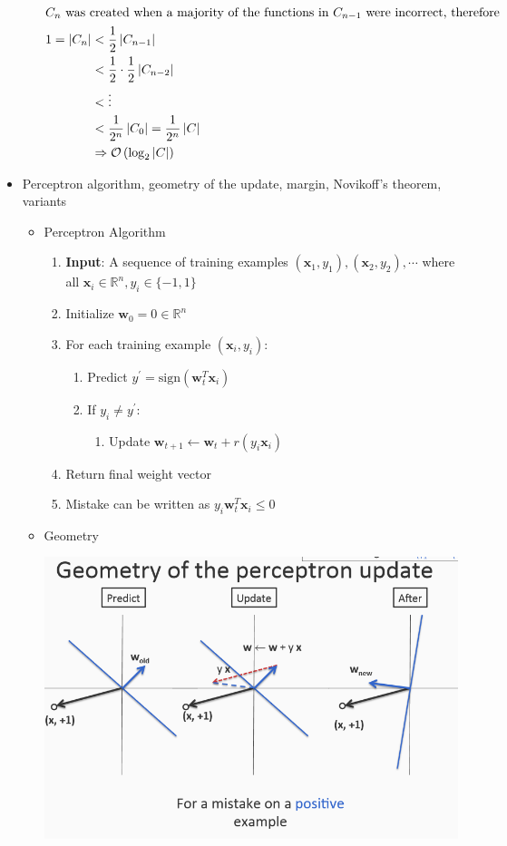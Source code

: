 \documentclass{article}
\begin{document}
\begin{itemize}
\begin{itemize}
\begin{align*}
		\intertext{$C_{n}$ was created when a majority of the functions in $C_{n-1}$ were incorrect, therefore}
		1 = \left| C_{n}\right| &< \frac{1}{2}\left| C_{n-1}\right|\\
					&< \frac{1}{2}\cdot \frac{1}{2}\left| C_{n-2}\right|\\
					&< \vdots\\
					&< \frac{1}{2^{n}}\left| C_{0}\right| = \frac{1}{2^{n}}\left| C\right|\\
					&\Rightarrow \mathcal{O}\left( \log_{2}\left|C \right|\right)
		\end{align*}
	\end{itemize}
\item Perceptron algorithm, geometry of the update, margin, Novikoff's theorem, variants
	\begin{itemize}
	\item Perceptron Algorithm
		\begin{enumerate}
		\item {\bf Input}: A sequence of training examples $(\mathbf{x}_{1},y_{1}),(\mathbf{x}_{2},y_{2}),\cdots$ where all $\mathbf{x}_{i}\in \mathbb{R}^{n}, y_{i}\in\{-1,1\}$
		\item Initialize $\mathbf{w}_{0}=0\in\mathbb{R}^{n}$
		\item For each training example $(\mathbf{x}_{i},y_{i})$:
			\begin{enumerate}
			\item Predict $y^{\prime}= \text{sign}(\mathbf{w}_{t}^{T}\mathbf{x}_{i})$
			\item If $y_{i} \neq y^{\prime}$:
				\begin{enumerate}
				\item Update $\mathbf{w}_{t+1}\leftarrow \mathbf{w}_{t} + r(y_{i}\mathbf{x}_{i})$
				\end{enumerate}
			\end{enumerate}
		\item Return final weight vector
		\item Mistake can be written as $y_{i}\mathbf{w}_{t}^{T}\mathbf{x}_{i}\leq 0$
		\end{enumerate}
	\item Geometry

		\begin{center}
		\includegraphics[width=.6\textwidth]{perceptron_postitiveGeometry.png}



\end{center}
\end{itemize}
\end{itemize}
\end{document}
